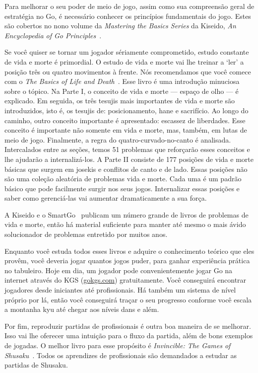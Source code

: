 Para melhorar o seu poder de meio de jogo, assim como sua compreensão geral de estratégia no Go, é necessário conhecer os princípios fundamentais do jogo. Estes são cobertos no nono volume da \emph{Mastering the Basics Series} da Kiseido, \emph{An Encyclopedia of Go Principles}~\cite{bozulich_encyclopedia_principles}.

Se você quiser se tornar um jogador sériamente comprometido, estudo constante de vida e morte é primordial. O estudo de vida e morte vai lhe treinar a `ler' a posição três ou quatro movimentos à frente. Nós recomendamos que você comece com o \emph{The Basics of Life and Death}~\cite{zeijst_bozulich_basics_of_life_and_death}. Esse livro é uma introdução minuciosa sobre o tópico. Na Parte I, o conceito de vida e morte --- espaço de olho --- é explicado. Em seguida, os três tesujis mais importantes de vida e morte são introduzidos, isto é, os tesujis de: posicionamento, hane e sacrifício. Ao longo do caminho, outro conceito importante é apresentado: escassez de liberdades. Esse conceito é importante não somente em vida e morte, mas, também, em lutas de meio de jogo. Finalmente, a regra do quatro-curvado-no-canto é analisada. Intercalados entre as seções, temos 51 problemas que reforçarão esses conceitos e lhe ajudarão a internalizá-los. A Parte II consiste de 177 posições de vida e morte básicas que surgem em josekis e conflitos de canto e de lado. Essas posições não são uma coleção aleatória de problemas vida e morte. Cada uma é um padrão básico que pode facilmente surgir nos seus jogos. Internalizar essas posições e saber como gerenciá-las vai aumentar dramaticamente a sua força.

A Kiseido e o SmartGo~\cite{smartgo} publicam um número grande de livros de problemas de vida e morte, então há material suficiente para manter até mesmo o mais ávido solucionador de problemas entretido por muitos anos.

Enquanto você estuda todos esses livros e adquire o conhecimento teórico que eles provêm, você deveria jogar quantos jogos puder, para ganhar experiência prática no tabuleiro. Hoje em dia, um jogador pode convenientemente jogar Go na internet através do KGS (\href{https://www.gokgs.com}{gokgs.com}) gratuitamente. Você conseguirá encontrar jogadores desde iniciantes até profissionais. Há também um sistema de nível próprio por lá, então você conseguirá traçar o seu progresso conforme você escala a montanha kyu até chegar aos níveis dans e além.

Por fim, reproduzir partidas de profissionais é outra boa maneira de se melhorar. Isso vai lhe oferecer uma intuição para o fluxo da partida, além de bons exemplos de jogadas. O melhor livro para esse propósito é \emph{Invincible: The Games of Shusaku}~\cite{power_invincible}. Todos os aprendizes de profissionais são demandados a estudar as partidas de Shusaku.